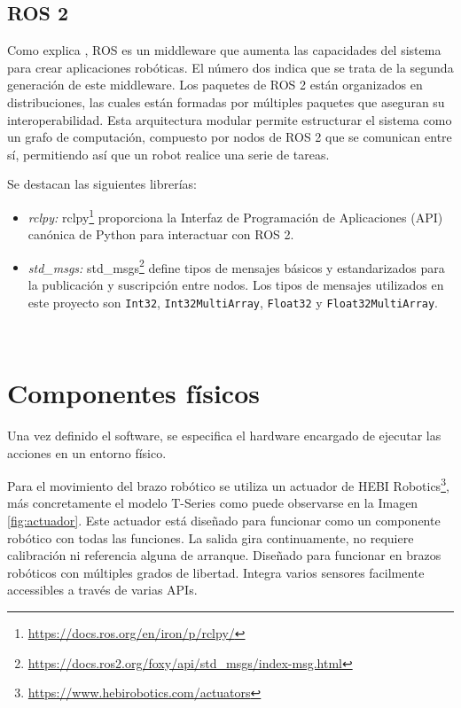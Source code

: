 \subsection{ROS 2}
\label{sec:entornos}

Como explica \cite{perales10a}, ROS es un middleware que aumenta las capacidades del sistema para crear aplicaciones robóticas. El número dos indica que se trata de la segunda generación de este middleware.
Los paquetes de ROS 2 están organizados en distribuciones, las cuales están formadas por múltiples paquetes que aseguran su interoperabilidad.
Esta arquitectura modular permite estructurar el sistema como un grafo de computación, compuesto por nodos de ROS 2 que se comunican entre sí, permitiendo así que un robot realice una serie de tareas.

Se destacan las siguientes librerías:

\begin{itemize}
    \item \textit{rclpy:} rclpy\footnote{\url{https://docs.ros.org/en/iron/p/rclpy/}} proporciona la Interfaz de Programación de Aplicaciones (API) canónica de Python para interactuar con ROS 2.
    \item \textit{std\_msgs:} std\_msgs\footnote{\url{https://docs.ros2.org/foxy/api/std_msgs/index-msg.html}} define tipos de mensajes básicos y estandarizados para la publicación y suscripción entre nodos. Los tipos de mensajes utilizados en este proyecto son \verb|Int32|, \verb|Int32MultiArray|, \verb|Float32| y \verb|Float32MultiArray|.
\end{itemize}\

\section{Componentes físicos}
\label{sec:entornos}

Una vez definido el software, se especifica el hardware encargado de ejecutar las acciones en un entorno físico.

Para el movimiento del brazo robótico se utiliza un actuador de HEBI Robotics\footnote{\url{https://www.hebirobotics.com/actuators}}, más concretamente el modelo T-Series como puede observarse en la Imagen \ref{fig:actuador}.
Este actuador está diseñado para funcionar como un componente robótico con todas las funciones.
La salida gira continuamente, no requiere calibración ni referencia alguna de arranque.
Diseñado para funcionar en brazos robóticos con múltiples grados de libertad.
Integra varios sensores facilmente accessibles a través de varias APIs.

